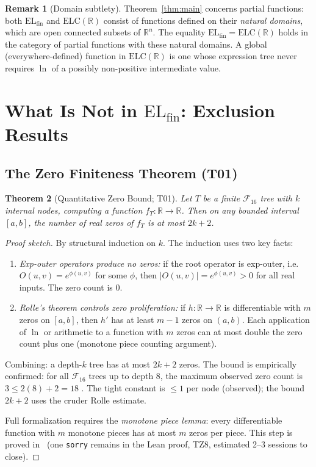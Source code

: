 \documentclass[12pt,a4paper]{article}
\newtheorem{theorem}{Theorem}[section]
\theoremstyle{definition}
\newtheorem{remark}[theorem]{Remark}
\newcommand{\F}{\mathcal{F}_{16}}
\newcommand{\ELfin}{\mathrm{EL}_{\mathrm{fin}}}
\newcommand{\ELC}{\mathrm{ELC}(\mathbb{R})}
\newcommand{\R}{\mathbb{R}}
\begin{document}
\begin{remark}[Domain subtlety]
Theorem~\ref{thm:main} concerns partial functions: both $\ELfin$ and $\ELC$
consist of functions defined on their \emph{natural domains}, which are
open connected subsets of $\R^n$.  The equality $\ELfin=\ELC$ holds in the
category of partial functions with these natural domains.  A global
(everywhere-defined) function in $\ELC$ is one whose expression tree never
requires $\ln$ of a possibly non-positive intermediate value.
\end{remark}

\section{What Is Not in \texorpdfstring{$\ELfin$}{ELfin}: Exclusion Results}
\label{sec:exclusion}

\subsection{The Zero Finiteness Theorem (T01)}
\label{ssec:zeros}

\begin{theorem}[Quantitative Zero Bound; T01]
\label{thm:zeros}
Let $T$ be a finite $\F$ tree with $k$ internal nodes, computing a function
$f_T:\R\to\R$.  Then on any bounded interval $[a,b]$, the number of real
zeros of $f_T$ is at most $2k+2$.
\end{theorem}

\begin{proof}[Proof sketch]
By structural induction on $k$.  The induction uses two key facts:
\begin{enumerate}
  \item \emph{Exp-outer operators produce no zeros:} if the root operator is
        exp-outer, i.e.\ $O(u,v)=e^{\phi(u,v)}$ for some $\phi$, then
        $|O(u,v)|=e^{\phi(u,v)}>0$ for all real inputs.  The zero count is 0.
  \item \emph{Rolle's theorem controls zero proliferation:} if $h:\R\to\R$ is
        differentiable with $m$ zeros on $[a,b]$, then $h'$ has at least $m-1$
        zeros on $(a,b)$.  Each application of $\ln$ or arithmetic to a
        function with $m$ zeros can at most double the zero count plus one
        (monotone piece counting argument).
\end{enumerate}
Combining: a depth-$k$ tree has at most $2k+2$ zeros.  The bound is
empirically confirmed: for all $\F$ trees up to depth 8, the maximum observed
zero count is $3 \le 2(8)+2=18$ \cite{TZ5}.  The tight constant is $\le 1$
per node (observed); the bound $2k+2$ uses the cruder Rolle estimate.

Full formalization requires the \emph{monotone piece lemma}: every
differentiable function with $m$ monotone pieces has at most $m$ zeros per
piece.  This step is proved in~\cite{TZ7} (one \texttt{sorry} remains in
the Lean proof, TZ8, estimated 2--3 sessions to close).
\end{proof}
\end{document}
